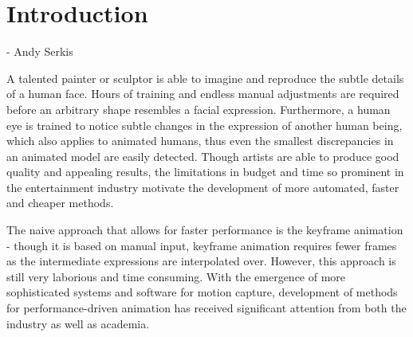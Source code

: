\chapter{Introduction}
\label{ch:intro}
\begin{center}
 - Andy Serkis
\end{center}

A talented painter or sculptor is able to imagine and reproduce the subtle details of a human face. Hours of training and endless manual adjustments are required before an arbitrary shape resembles a facial expression. Furthermore, a human eye is trained to notice subtle changes in the expression of another human being, which also applies to animated humans, thus even the smallest discrepancies in an animated model are easily detected. Though artists are able to produce good quality and appealing results, the limitations in budget and time so prominent in the entertainment industry motivate the development of more automated, faster and cheaper methods.

The naive approach that allows for faster performance is the keyframe animation - though it is based on manual input, keyframe animation requires fewer frames as the intermediate expressions are interpolated over. However, this approach is still very laborious and time consuming. With the emergence of more sophisticated systems and software for motion capture, development of methods for performance-driven animation has received significant attention from both the industry as well as academia.
